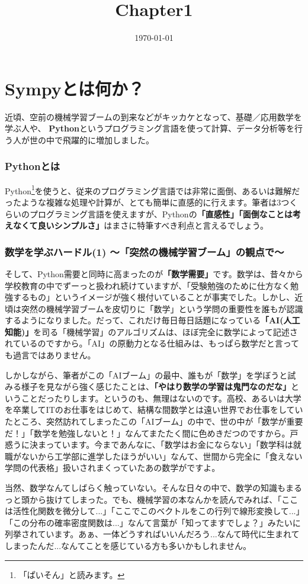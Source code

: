 \documentclass[12pt, a5paper]{bxjsbook}
\title{Chapter1}
\date{\today}
\begin{document}
\tableofcontents
\chapter{Sympyとは何か？}
近頃、空前の機械学習ブームの到来などがキッカケとなって、基礎／応用数学を学ぶ人や、 {\bf Python}というプログラミング言語を使って計算、データ分析等を行う人が世の中で飛躍的に増加しました。
\subsection{Pythonとは}
Python\footnote{「ぱいそん」と読みます。}を使うと、従来のプログラミング言語では非常に面倒、あるいは難解だったような複雑な処理や計算が、とても簡単に直感的に行えます。筆者は3つくらいのプログラミング言語を使えますが、Pythonの{\bf 「直感性」「面倒なことは考えなくて良いシンプルさ」}はまさに特筆すべき利点と言えるでしょう。
\subsection{数学を学ぶハードル(1) 〜「突然の機械学習ブーム」の観点で〜}
そして、Python需要と同時に高まったのが{\bf 「数学需要」}です。数学は、昔々から学校教育の中でずーっと扱われ続けていますが、「受験勉強のために仕方なく勉強するもの」というイメージが強く根付いていることが事実でした。しかし、近頃は突然の機械学習ブームを皮切りに「数学」という学問の重要性を誰もが認識するようになりました。だって、これだけ毎日毎日話題になっている{\bf 「AI(人工知能)」}を司る「機械学習」のアルゴリズムは、ほぼ完全に数学によって記述されているのですから。「AI」の原動力となる仕組みは、もっぱら数学だと言っても過言ではありません。

しかしながら、筆者がこの「AIブーム」の最中、誰もが「数学」を学ぼうと試みる様子を見ながら強く感じたことは、{\bf 「やはり数学の学習は鬼門なのだな」}ということだったりします。というのも、無理はないのです。高校、あるいは大学を卒業してITのお仕事をはじめて、結構な間数学とは遠い世界でお仕事をしていたところ、突然訪れてしまったこの「AIブーム」の中で、世の中が「数学が重要だ！」「数学を勉強しないと！」なんてまたたく間に色めきだつのですから。戸惑うに決まっています。今まであんなに、「数学はお金にならない」「数学科は就職がないから工学部に進学したほうがいい」なんて、世間から完全に「食えない学問の代表格」扱いされまくっていたあの数学がですよ。

当然、数学なんてしばらく触っていない。そんな日々の中で、数学の知識もまるっと頭から抜けてしまった。でも、機械学習の本なんかを読んでみれば、「ここは活性化関数を微分して...」「ここでこのベクトルをこの行列で線形変換して...」「この分布の確率密度関数は...」なんて言葉が「知ってますでしょ？」みたいに列挙されています。あぁ、一体どうすればいいんだろう...なんて時代に生まれてしまったんだ...なんてことを感じている方も多いかもしれません。
\end{document}

